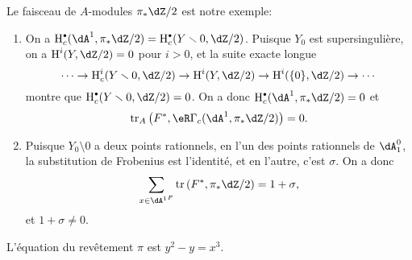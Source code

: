 Le faisceau de $A$-modules $\pi_*\dZ/2$ est notre exemple:
\begin{enumerate}[\indent a)]
  \item On a 
    $\h_c^\bullet(\dA^1,\pi_*\dZ/2) = \h_c^\bullet(Y\setminus 0,\dZ/2)$. 
    Puisque $Y_0$ est supersingulière, on a $\h^i(Y,\dZ/2)=0$ pour $i>0$, et 
    la suite exacte longue 
    \[
      \cdots \to \h_c^i(Y\setminus 0,\dZ/2) \to \h^i(Y,\dZ/2) \to \h^i(\{0\},\dZ/2) \to \cdots
    \]
    montre que $\h_c^\bullet(Y\setminus 0,\dZ/2)=0$. On a donc 
    $\h_c^\bullet(\dA^1,\pi_*\dZ/2)=0$ et 
    \[
      \tr_A\left(F^*,\eR\Gamma_c(\dA^1,\pi_*\dZ/2)\right) = 0 \text{.}
    \]
  \item Puisque $Y_0\setminus 0$ a deux points rationnels, en l'un des points 
    rationnels de $\dA_1^0$, la substitution de Frobenius est l'identité, et 
    en l'autre, c'est $\sigma$. On a donc 
    \[
      \sum_{x\in {\dA^1}^F} \tr\left(F^*,\pi_*\dZ/2\right) = 1+\sigma \text{,}
    \]
    et $1+\sigma\ne 0$.
\end{enumerate}

L'équation du revêtement $\pi$ est $y^2-y=x^3$.